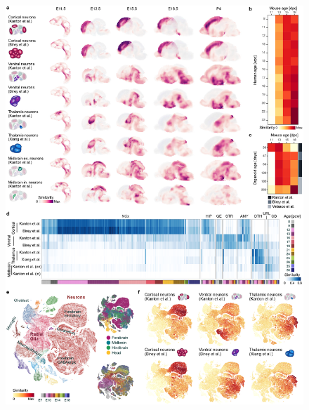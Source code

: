 \begin{figure}[h!]
    \centering
	\includegraphics[width=\textwidth]{figures/voxhunt/Supp_4}
    \label{fig:voxS4}
\end{figure}

